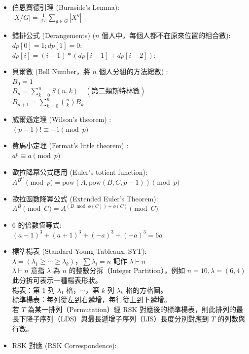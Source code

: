 \begin{itemize}
      $\frac{1}{m} \sum_{i=1}^{m}{c^{\gcd(i,m)}}$
    \item 伯恩賽德引理 (Burnside's Lemma): \\
      $|X/G| = \frac{1}{|G|}\sum\limits_{g\in G} |X^g|$
    \item 錯排公式 (Derangements) ($n$ 個人中，每個人都不在原來位置的組合數): \\
      $dp[0]=1; dp[1]=0;$\\
      $dp[i]=(i-1)*(dp[i-1]+dp[i-2]);$
    \item 貝爾數 (Bell Number，將 $n$ 個人分組的方法總數) : \\
      $B_0= 1$\\
      $B_n= \sum_{k=0}^{n} S(n,k)\quad (\text{第二類斯特林數})$\\
      $B_{n+1}= \sum_{k=0}^{n}{n \choose k} B_k$
    \item 威爾遜定理 (Wilson's theorem) :\\
      $(p-1)! \equiv -1 \pmod p$
    \item 費馬小定理 (Fermat's little theorem) :\\
      $a^p \equiv a \pmod p$
    \item 歐拉降冪公式應用 (Euler's totient function):\\
      $A ^ {B ^ C} \pmod p = \text{pow}(A,\text{pow}(B,C,p-1)) \pmod p$
    \item 歐拉函數降冪公式 (Extended Euler's Theorem):\\
      $A^B \pmod C = A^{(B \bmod \phi(C)) + \phi(C)} \pmod C$
    \item 6 的倍數恆等式: \\
      $(a-1)^3 + (a+1)^3 + (-a)^3 + (-a)^3 = 6a$
    \item 標準楊表 (Standard Young Tableaux, SYT): \\
      $\lambda=(\lambda _{1}\geq \cdots \geq \lambda _{k})$，$\sum \lambda _{i} = n$ 記作 $\lambda \vdash n$\\
      $\lambda \vdash n$ 意指 $\lambda$ 為 $n$ 的整數分拆（Integer Partition），例如 $n = 10, \lambda = (6,4)$ 此分拆可表示一種楊表形狀。\\
      楊表：第 $1$ 列 $\lambda _{1}$ 格，$\cdots$，第 $k$ 列 $\lambda_{k}$ 格的方格圖。\\
      標準楊表：每列從左到右遞增，每行從上到下遞增。 \\
      若 $T$ 為某一排列（Permutation）經 RSK 對應後的標準楊表，則此排列的最長下降子序列（LDS）與最長遞增子序列（LIS）長度分別對應到 $T$ 的列數與行數。
    \item RSK 對應 (RSK Correspondence): \\

\end{itemize}
